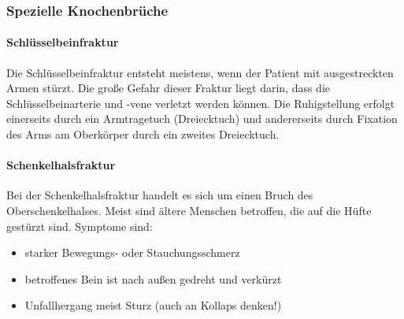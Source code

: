 
\subsubsection{Spezielle Knochenbrüche}

\paragraph{Schlüsselbeinfraktur} Die Schlüsselbeinfraktur entsteht meistens, wenn
der Patient mit ausgestreckten Armen stürzt. Die große Gefahr dieser Fraktur
liegt darin, dass die Schlüsselbeinarterie und -vene verletzt werden können. Die
Ruhigstellung erfolgt einerseits durch ein Armtragetuch (Dreiecktuch) und
andererseits durch Fixation des Arms am Oberkörper durch ein zweites Dreiecktuch.

\paragraph{Schenkelhalsfraktur} Bei der Schenkelhalsfraktur handelt es sich um
einen Bruch des Oberschenkelhalses. Meist sind ältere Menschen betroffen, die auf
die Hüfte gestürzt sind. Symptome sind:
\begin{itemize}
	\item starker Bewegungs- oder Stauchungsschmerz
	\item betroffenes Bein ist nach außen gedreht und verkürzt
	\item Unfallhergang meist Sturz (auch an Kollaps denken!)
\end{itemize}

